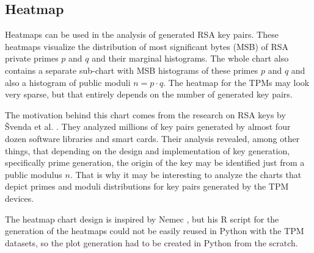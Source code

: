 \subsection{Heatmap}
Heatmaps can be used in the analysis of generated RSA key pairs. These heatmaps visualize the distribution of most significant bytes (MSB) of RSA private primes $p$ and $q$ and their marginal histograms. The whole chart also contains a separate sub-chart with MSB histograms of these primes $p$ and $q$ and also a histogram of public moduli $n = p \cdot q$. The heatmap for the TPMs may look very sparse, but that entirely depends on the number of generated key pairs.

The motivation behind this chart comes from the research on RSA keys by Švenda et al. \cite{svenda-1mrsa_usenix2016}. They analyzed millions of key pairs generated by almost four dozen software libraries and smart cards. Their analysis revealed, among other things, that depending on the design and implementation of key generation, specifically prime generation, the origin of the key may be identified just from a public modulus $n$. That is why it may be interesting to analyze the charts that depict primes and moduli distributions for key pairs generated by the TPM devices.

The heatmap chart design is inspired by Nemec \cite{Nemec2016thesis}, but his R script for the generation of the heatmaps could not be easily reused in Python with the TPM datasets, so the plot generation had to be created in Python from the scratch.

